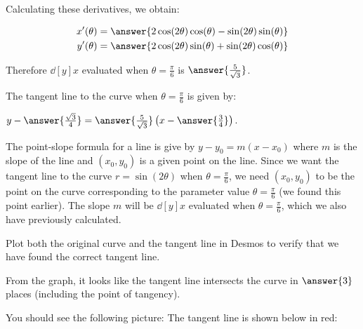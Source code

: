 \documentclass{ximera}
\begin{document}
\begin{exercise}
\begin{exercise}
\begin{hint}
Calculating these derivatives, we obtain:

\begin{align*}
x'(\theta)&=\answer{ 2\cos(2\theta)\cos(\theta)- \sin(2\theta)\sin(\theta)} \\
y'(\theta)&=\answer{ 2\cos(2\theta)\sin(\theta)+\sin(2\theta)\cos(\theta) }
\end{align*} 

Therefore $\dd[y]{x}$ evaluated when $\theta=\frac{\pi}{6}$ is $\answer{ \frac{5}{\sqrt{3}}  }$.


\end{hint}

\begin{exercise}

The tangent line to the curve when $\theta=\frac{\pi}{6}$ is given by: 

$y-\answer{\frac{\sqrt{3}}{4}   }=\answer{ \frac{5}{\sqrt{3}}  }\left( x- \answer{  \frac{3}{4} }  \right)$. 

\begin{hint}


The point-slope formula for a line is give by $y-y_0=m (x-x_0)$ where $m$ is the slope of the line and $(x_{0},y_{0})$ is a given point on the line. 
Since we want the tangent line to the curve $r=\sin(2\theta)$ when $\theta=\frac{\pi}{6}$, we need $(x_{0},y_{0})$ to be the point on the curve corresponding to the parameter value $\theta=\frac{\pi}{6}$ (we found this point earlier). The slope $m$ will be $\dd[y]{x}$ evaluated when $\theta=\frac{\pi}{6}$, which we also have previously calculated. 

\end{hint}

\begin{exercise}
Plot both the original curve and the tangent line in Desmos to verify that we have found the correct tangent line.  

From the graph, it looks like the tangent line intersects the curve in $\answer{3}$ places (including the point of tangency).


\begin{hint}
You should see the following picture:
The tangent line is shown below in red:


\end{hint}
\end{exercise}
\end{exercise}
\end{exercise}
\end{exercise}
\end{document}
